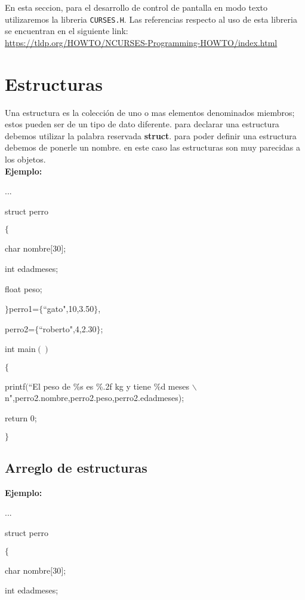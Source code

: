 \documentclass[]{article}
\begin{document}
	En esta seccion, para el desarrollo de control de pantalla en modo texto utilizaremos la libreria \texttt{CURSES.H}. Las referencias respecto al uso de esta libreria se encuentran en el siguiente link:\\
	
	\url{https://tldp.org/HOWTO/NCURSES-Programming-HOWTO/index.html}
	
		
	\section{Estructuras}
	
	Una estructura es la colección de uno o mas elementos denominados miembros; estos pueden ser de un tipo de dato diferente. para declarar una estructura debemos utilizar la palabra reservada \textbf{struct}. para poder definir una estructura debemos de ponerle un nombre. en este caso las estructuras son muy parecidas a los objetos.\\
	
	\textbf{Ejemplo:\\}
	
	...
	
	struct perro
	
	$\lbrace$
	
	char nombre$[$30$]$;
	
	int edadmeses;
	
	float peso;
	
	$\rbrace$perro1=$\lbrace$``gato",10,3.50$\rbrace$,
	
	perro2=$\lbrace$``roberto",4,2.30$\rbrace$;
	
	int main$()$
	
	$\lbrace$
	
	printf$($``El peso de \%s es \%.2f kg y tiene \%d meses $\backslash$n",perro2.nombre,perro2.peso,perro2.edadmeses);
	
	return 0;
	
	$\rbrace$
	
	\subsection{Arreglo de estructuras}
	
	\textbf{Ejemplo:\\}
	
	...
	
	struct perro
	
	$\lbrace$
	
	char nombre$[$30$]$;
	
	int edadmeses;
	
\end{document}
